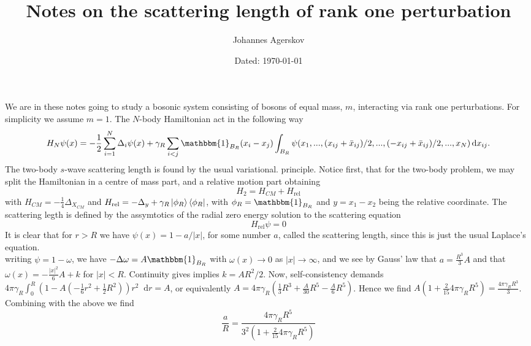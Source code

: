 \documentclass[a4paper,11pt]{article}
\author{Johannes Agerskov}
\date{Dated: \today}
\title{Notes on the scattering length of rank one perturbation}
\newcommand{\abs}[1]{\left\lvert #1 \right\rvert}
\newcommand*\diff{\mathop{}\!\mathrm{d}}
\numberwithin{equation}{section}
\begin{document}
	\maketitle
\vspace{1cm}
We are in these notes going to study a bosonic system consisting of bosons of equal mass, $ m $, interacting via rank one perturbations. For simplicity we assume $ m=1 $. The $ N $-body Hamiltonian act in the following way\begin{equation}
H_N\psi(x)=-\frac{1}{2}\sum_{i=1}^{N}\Delta_i\psi(x)+\gamma_R\sum_{i<j}\mathbbm{1}_{B_R}(x_i-x_j)\int_{B_R}\psi(x_1,...,(x_{ij}+\bar{x}_{ij})/2,...,(-x_{ij}+\bar{x}_{ij})/2,...,x_N)\diff x_{ij}.
\end{equation}
The two-body $ s $-wave scattering length is found by the usual variational. principle. Notice first, that for the two-body problem, we may split the Hamiltonian in a centre of mass part, and a relative motion part obtaining \begin{equation}
H_2=H_{CM}+H_{\text{rel}}
\end{equation}
with $ H_{CM}=-\frac{1}{4}\Delta_{X_{CM}} $ and $ H_{\text{rel}}=-\Delta_y+\gamma_R \ket{\phi_R}\bra{\phi_R} $, with $ \phi_R=\mathbbm{1}_{B_R} $ and $ y=x_1-x_2 $ being the relative coordinate. The scattering legth is defined by the assymtotics of the radial zero energy solution to the scattering equation \begin{equation}
H_{\text{rel}}\psi=0
\end{equation}
It is clear that for $ r>R $ we have $ \psi(x)=1-a/\abs{x} $, for some number $ a $, called the scattering length, since this is just the usual Laplace's equation.\\
writing $ \psi=1-\omega $, we have $ -\Delta\omega=A\mathbbm{1}_{B_R} $ with $ \omega(x)\to0 $ as $ \abs{x}\to\infty $, and we see by Gauss' law that $ a=\frac{R^3}{3}A $ and that $ \omega(x)=-\frac{ \abs{x}^2}{6}A+k $ for $ \abs{x}<R $. Continuity gives implies $ k=AR^2/2$. Now, self-consistency demands $ 4\pi\gamma_R\int_{0}^{R}(1-A(-\frac{1}{6}r^2+\frac{1}{2}R^2))r^2\diff r=A $, or equivalently $ A=4\pi\gamma_R\left(\frac{1}{3}R^3+\frac{A}{30}R^5-\frac{A}{6}R^5\right) $. Hence we find $ A\left(1+\frac{2}{15}4\pi\gamma_RR^5\right)=\frac{4\pi\gamma_RR^3}{3} $. Combining with the above we find \begin{equation}
\frac{a}{R}=\frac{4\pi\gamma_RR^5}{3^2(1+\frac{2}{15}4\pi\gamma_R R^5)}
\end{equation}
\end{document}
